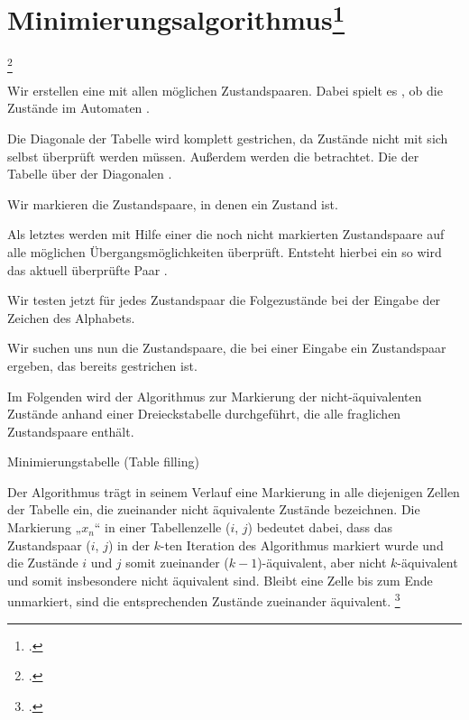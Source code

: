 \documentclass{bschlangaul-theorie}
\begin{document}

\section{Minimierungsalgorithmus\footcite[Seite 47-57]{vossen}}

\footcite[Seite 51-62]{theo:fs:1}

Wir erstellen eine  mit allen möglichen
Zustandspaaren. Dabei spielt es , ob die
Zustände im Automaten .

Die Diagonale der Tabelle wird komplett gestrichen, da Zustände nicht
mit sich selbst überprüft werden müssen. Außerdem werden die
 betrachtet. Die 
der Tabelle über der Diagonalen .

Wir markieren die Zustandspaare, in denen ein Zustand  ist.

Als letztes werden mit Hilfe einer  die noch
nicht markierten Zustandspaare auf alle möglichen Übergangsmöglichkeiten
überprüft. Entsteht hierbei ein  so
wird das aktuell überprüfte Paar .

Wir testen jetzt für jedes Zustandspaar die Folgezustände bei der
Eingabe der Zeichen des Alphabets.

Wir suchen uns nun die Zustandspaare, die bei einer Eingabe ein
Zustandspaar ergeben, das bereits gestrichen ist.

Im Folgenden wird der Algorithmus zur Markierung der nicht-äquivalenten
Zustände anhand einer Dreieckstabelle durchgeführt, die alle fraglichen
Zustandspaare enthält.

Minimierungstabelle (Table filling)

Der Algorithmus trägt in seinem Verlauf eine Markierung in alle
diejenigen Zellen der Tabelle ein, die zueinander nicht äquivalente
Zustände bezeichnen. Die Markierung „$x_n$“ in einer Tabellenzelle ($i$,
$j$) bedeutet dabei, dass das Zustandspaar ($i$, $j$) in der $k$-ten
Iteration des Algorithmus markiert wurde und die Zustände $i$ und $j$
somit zueinander ($k - 1$)-äquivalent, aber nicht $k$-äquivalent und
somit insbesondere nicht äquivalent sind. Bleibt eine Zelle bis zum Ende
unmarkiert, sind die entsprechenden Zustände zueinander äquivalent.
\footcite[Seite 19]{koenig}


\literatur
\end{document}
